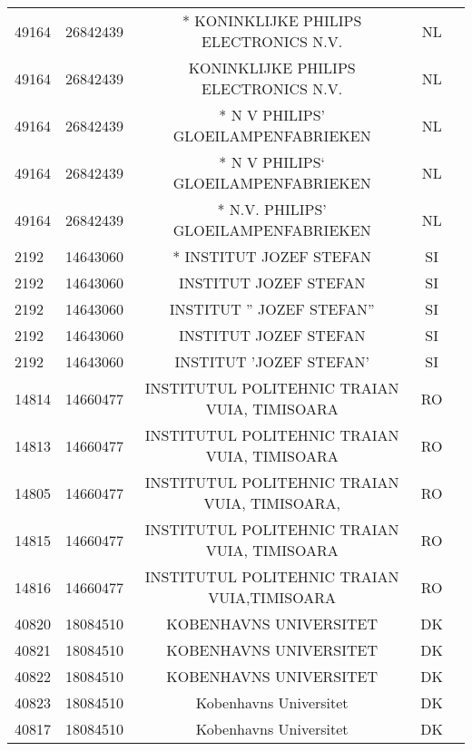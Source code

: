 \begin{longtable}{|l|c|c|c|c|}
     49164 &   26842439 &             * KONINKLIJKE PHILIPS ELECTRONICS N.V. &      NL \\
     49164 &   26842439 &               KONINKLIJKE PHILIPS ELECTRONICS N.V. &      NL \\
     49164 &   26842439 &                * N V PHILIPS' GLOEILAMPENFABRIEKEN &      NL \\
     49164 &   26842439 &                * N V PHILIPS` GLOEILAMPENFABRIEKEN &      NL \\
     49164 &   26842439 &               * N.V. PHILIPS' GLOEILAMPENFABRIEKEN &      NL \\
      2192 &   14643060 &                            * INSTITUT JOZEF STEFAN &      SI \\
      2192 &   14643060 &                             INSTITUT  JOZEF STEFAN &      SI \\
      2192 &   14643060 &                         INSTITUT '' JOZEF STEFAN'' &      SI \\
      2192 &   14643060 &                              INSTITUT JOZEF STEFAN &      SI \\
      2192 &   14643060 &                            INSTITUT 'JOZEF STEFAN' &      SI \\
     14814 &   14660477 &       INSTITUTUL POLITEHNIC TRAIAN VUIA, TIMISOARA &      RO \\
     14813 &   14660477 &       INSTITUTUL POLITEHNIC TRAIAN VUIA, TIMISOARA &      RO \\
     14805 &   14660477 &      INSTITUTUL POLITEHNIC TRAIAN VUIA, TIMISOARA, &      RO \\
     14815 &   14660477 &       INSTITUTUL POLITEHNIC TRAIAN VUIA, TIMISOARA &      RO \\
     14816 &   14660477 &        INSTITUTUL POLITEHNIC TRAIAN VUIA,TIMISOARA &      RO \\
     40820 &   18084510 &                             KOBENHAVNS UNIVERSITET &      DK \\
     40821 &   18084510 &                             KOBENHAVNS UNIVERSITET &      DK \\
     40822 &   18084510 &                             KOBENHAVNS UNIVERSITET &      DK \\
     40823 &   18084510 &                             Kobenhavns Universitet &      DK \\
     40817 &   18084510 &                             Kobenhavns Universitet &      DK \\

\end{longtable}
